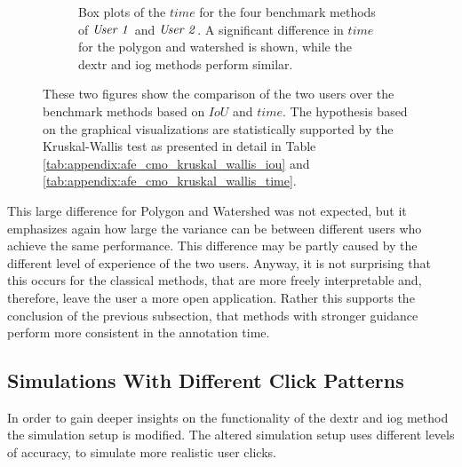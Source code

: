 \begin{figure} [h!]
\begin{subfigure}[t]{0.45\textwidth}
 		\caption{
 			Box plots of the $ time $ for the four benchmark methods of $ \textnormal{\textit{User 1}} $ and $ \textnormal{\textit{User 2}} $.
 			A significant difference in $ time $ for the polygon and watershed is shown, while the \gls{dextr} and \gls{iog} methods perform similar.
 		}\label{fig:ch5:sec3:cmo_afe_time}
 	\end{subfigure}
 	\caption[Box plots of two experienced user on $ IoU $ and $ time$.]{		
 		These two figures show the comparison of the two users over the benchmark methods based on $ IoU $ and $ time $.
 		The hypothesis based on the graphical visualizations are statistically supported by the Kruskal-Wallis test as presented in detail in Table \ref{tab:appendix:afe_cmo_kruskal_wallis_iou} and \ref{tab:appendix:afe_cmo_kruskal_wallis_time}.
 	}\label{fig:ch5:sec3:cmo_afe}
\end{figure}

This large difference for Polygon and Watershed was not expected, but it emphasizes again how large the variance can be between different users who achieve the same performance.
This difference may be partly caused by the different level of experience of the two users.
Anyway, it is not surprising that this occurs for the classical methods, that are more freely interpretable and, therefore, leave the user a more open application.
Rather this supports the conclusion of the previous subsection, that methods with stronger guidance perform more consistent in the annotation time.


\subsection{Simulations With Different Click Patterns}\label{ord:ch5:sec3:subsec3}



In order to gain deeper insights on the functionality of the \gls{dextr} and \gls{iog} method the simulation setup is modified.
The altered simulation setup uses different levels of accuracy, to simulate more realistic user clicks.

